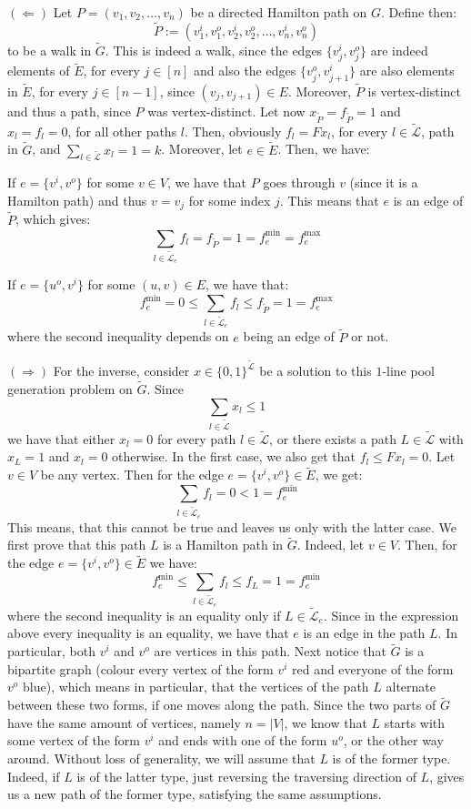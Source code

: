 \documentclass[12pt]{article}
\newenvironment{a_enum}{\begin{enumerate}[label=(\alph{*})]}{\end{enumerate}} %
\newenvironment{b_item}{\begin{itemize}}{\end{itemize}} %
\begin{document}
\begin{a_enum}
$(\Leftarrow)$ Let $P=(v_1,v_2,\ldots,v_n)$ be a directed Hamilton path on $G$. Define then:
$$\tilde P:=(v_1^i,v_1^o,v_2^i,v_2^o,\ldots,v_n^i,v_n^o)$$
to be a walk in $\tilde G$. This is indeed a walk, since the edges $\{v_j^i,v_j^o\}$ are indeed elements of $\tilde E$, for every $j\in[n]$ and also the edges $\{v_j^o,v_{j+1}^i\}$ are also elements in $\tilde E$, for every $j\in[n-1]$, since $(v_j,v_{j+1})\in E$. Moreover, $\tilde P$ is vertex-distinct and thus a path, since $P$ was vertex-distinct.
Let now $x_{\tilde P}=f_{\tilde P}=1$ and $x_l=f_l=0$, for all other paths $l$. Then, obviously $f_l=Fx_l$, for every $l\in\tilde{\mathcal{L}}$, path in $\tilde G$, and $\sum_{l\in\tilde{\mathcal{L}}}x_l=1=k$. Moreover, let $e\in\tilde E$. Then, we have:
\begin{b_item}
\item If $e=\{v^i,v^o\}$ for some $v\in V$, we have that $P$ goes through $v$ (since it is a Hamilton path) and thus $v=v_j$ for some index $j$. This means that $e$ is an edge of $\tilde P$, which gives:
$$\sum_{l\in\tilde{\mathcal{L}}_e}f_l=f_{\tilde P}=1=f_e^{\min}=f_e^{\max}$$
\item If $e=\{u^o,v^i\}$ for some $(u,v)\in E$, we have that:
$$f_e^{\min}=0\leq\sum_{l\in\tilde{\mathcal{L}}_e}f_l\leq f_{\tilde P}=1=f_e^{\max}$$
where the second inequality depends on $e$ being an edge of $\tilde{P}$ or not.
\end{b_item}

$(\Rightarrow)$ For the inverse, consider $x\in\{0,1\}^{\tilde{\mathcal{L}}}$ be a solution to this $1$-line pool generation problem on $\tilde G$. Since
$$\sum_{l\in\tilde{\mathcal{L}}}x_l\leq 1$$
we have that either $x_l=0$ for every path $l\in\tilde{\mathcal{L}}$, or there exists a path $L\in\tilde{\mathcal{L}}$ with $x_L=1$ and $x_l=0$ otherwise. In the first case, we also get that $f_l\leq Fx_l=0$. Let $v\in V$ be any vertex. Then for the edge $e=\{v^i,v^o\}\in\tilde E$, we get:
$$\sum_{l\in\tilde{\mathcal{L}}_e}f_l=0<1=f_e^{\min}$$
This means, that this cannot be true and leaves us only with the latter case. We first prove that this path $L$ is a Hamilton path in $\tilde G$. Indeed, let $v\in V$. Then, for the edge $e=\{v^i,v^o\}\in\tilde E$ we have:
$$f_e^{\min}\leq\sum_{l\in\tilde{\mathcal{L}}_e}f_l\leq f_L=1=f_e^{\min}$$
where the second inequality is an equality only if $L\in\tilde{\mathcal{L}}_e$. Since in the expression above every inequality is an equality, we have that $e$ is an edge in the path $L$. In particular, both $v^i$ and $v^o$ are vertices in this path. Next notice that $\tilde G$ is a bipartite graph (colour every vertex of the form $v^i$ red and everyone of the form $v^o$ blue), which means in particular, that the vertices of the path $L$ alternate between these two forms, if one moves along the path. Since the two parts of $\tilde{G}$ have the same amount of vertices, namely $n=|V|$, we know that $L$ starts with some vertex of the form $v^i$ and ends with one of the form $u^o$, or the other way around. Without loss of generality, we will assume that $L$ is of the former type. Indeed, if $L$ is of the latter type, just reversing the traversing direction of $L$, gives us a new path of the former type, satisfying the same assumptions.


\end{a_enum}
\end{document}
